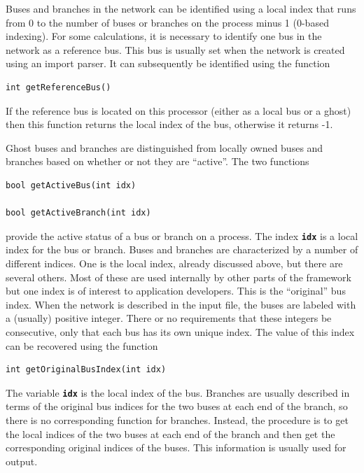 Buses and branches in the network can be identified using a local index that runs from 0 to the number of buses or branches on the process minus 1 (0-based indexing). For some calculations, it is necessary to identify one bus in the network as a reference bus. This bus is usually set when the network is created using an import parser. It can subsequently be identified using the function

{
\color{red}
\begin{Verbatim}[fontseries=b]
int getReferenceBus()
\end{Verbatim}
}

If the reference bus is located on this processor (either as a local bus or a ghost) then this function returns the local index of the bus, otherwise it returns -1.

Ghost buses and branches are distinguished from locally owned buses and branches based on whether or not they are ``active''. The two functions

{
\color{red}
\begin{Verbatim}[fontseries=b]
bool getActiveBus(int idx)

bool getActiveBranch(int idx)
\end{Verbatim}
}

provide the active status of a bus or branch on a process. The index \texttt{\textbf{idx}} is a local index for the bus or branch.
Buses and branches are characterized by a number of different indices. One is the local index, already discussed above, but there are several others. Most of these are used internally by other parts of the framework but one index is of interest to application developers. This is the ``original'' bus index. When the network is described in the input file, the buses are labeled with a (usually) positive integer. There or no requirements that these integers be consecutive, only that each bus has its own unique index. The value of this index can be recovered using the function

{
\color{red}
\begin{Verbatim}[fontseries=b]
int getOriginalBusIndex(int idx)
\end{Verbatim}
}

The variable \texttt{\textbf{idx}} is the local index of the bus. Branches are usually described in terms of the original bus indices for the two buses at each end of the branch, so there is no corresponding function for branches. Instead, the procedure is to get the local indices of the two buses at each end of the branch and then get the corresponding original indices of the buses. This information is usually used for output.

